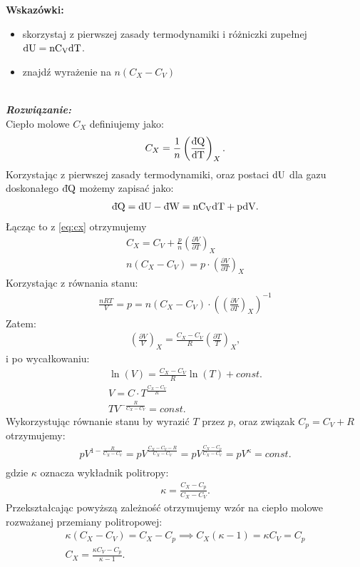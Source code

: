 \documentclass[11pt,a4paper]{article}
\newcounter{rozwiazanie}\newcommand{\rozwiazanie}[1][]{\addtocounter{rozwiazanie}{1} ~\\  {\bf \emph{Rozwiązanie: }} \\}
\newcommand{\dbar}{{\mkern3mu\mathchar'26\mkern-12mu d}}
\begin{document}
\textbf{Wskazówki:}
\begin{itemize}
\item skorzystaj z pierwszej zasady termodynamiki i różniczki zupełnej $\rm{d}U = n C_V \rm{d}T$.
\item znajdź wyrażenie na $n(C_X - C_V)$
\end{itemize}

\vspace{5mm}
\rozwiazanie
Ciepło molowe $C_X$ definiujemy jako:
\begin{align}
C_X = \frac{1}{n}\left( \frac{\rm{\dbar Q}}{\rm{d}T}\right)_X. \label{eq:cx}
\end{align}
Korzystając z pierwszej zasady termodynamiki, oraz postaci $\rm{d}U$ dla gazu doskonałego $\rm{\dbar} Q $ możemy zapisać jako:
\begin{align*}
\rm{\dbar } Q =  \rm{d} U -  \rm{\dbar} W =  n C_V \rm{d} T +  p \rm{d}V.
\end{align*}
Łącząc to z \eqref{eq:cx} otrzymujemy 
\begin{align}
C_X = C_V +\frac{p}{n} \left(\frac{\partial V}{\partial T} \right)_X \\
n(C_X - C_V) =  p \cdot \left(\frac{\partial V}{\partial T} \right)_X
\end{align}
Korzystając z równania stanu: 
\begin{align*}
\frac{n R T}{V} = p =n( C_X - C_V  ) \cdot \left(\left(\frac{\partial V}{\partial T} \right)_X \right)^{-1}
\end{align*}
Zatem:
\begin{align}
\left(\frac{\partial V}{V}\right)_X=\frac{C_X -C_V}{R} \left(\frac{\partial T}{T}\right)_X,
\end{align}
i po wycałkowaniu:
\begin{align}
\ln(V) = \frac{C_X -C_V}{R} \ln(T) + const.\\
V = C \cdot T^{\frac{C_X -C_V}{R}} \\
T V^{- \frac{R}{C_X-C_V}}=const.
\end{align}
Wykorzystując równanie stanu by wyrazić $T$ przez $p$, oraz związak $C_p = C_V + R$ otrzymujemy:
\begin{align}
  p V^{1- \frac{R}{C_X-C_V}}=
  p V^{\frac{C_X - C_V - R}{C_X-C_V}} = p V^{\frac{C_X - C_p}{C_X-C_V}} = p V^{\kappa }=const. \\
\end{align}
gdzie $\kappa$ oznacza wykładnik politropy:
\begin{align}
\kappa =\frac{C_X - C_p}{C_X - C_V}. \label{eq:kappa}
\end{align}
Przekształcając powyższą zależność otrzymujemy wzór na ciepło molowe rozważanej przemiany politropowej:
\begin{align}
\kappa (C_X - C_V) = C_X - C_p \implies C_X (\kappa - 1) = \kappa C_V = C_p \\
C_X = \frac{\kappa C_V -C_p}{\kappa -1}. \label{eq:cx2}
\end{align}
\end{document}
